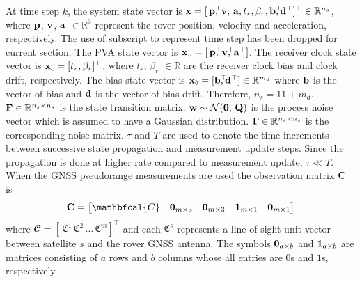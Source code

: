 At time step $k$, the system state vector is $\Boldx = [\,\Boldp^\top \dss,  \, \Boldv^\top \dss, \, \Bolda^\top \dss, t_r, \beta_r, \Boldb^\top \dss, \Boldd^\top ]^\top \in \mathbb{R}^{n_s} $, where $\mathbf{p}$, $\mathbf{v}$, $\mathbf{a}$ $\in \mathbb{R}^3$ represent the rover position, velocity and acceleration, respectively.
The use of subscript to represent time step has been dropped for current section. 
The PVA state vector is $\Boldx_v = [\,\Boldp^\top \dss,  \, \Boldv^\top \dss, \, \Bolda^\top]$.
The receiver clock state vector is $\mathbf{x}_c = [t_r, \beta_r]^\top$, where $t_r$, $\beta_r$ $\in \mathbb{R}$ are the receiver clock bias and clock drift, respectively. 
The bias state vector is $\mathbf{x}_b = [ \mathbf{b}^\top \!\!\!\!, \mathbf{d}^\top ] \in \mathbb{R}^{m_d}$ where $\mathbf{b}$ is the vector of bias and $\mathbf{d}$ is the vector of bias drift. 
Therefore, $n_s = 11 + m_d$. $\mathbf{F} \in \mathbb{R}^{n_s \times n_s}$ is the state transition matrix.
$\mathbf{w} \sim \mathcal{N}(\boldsymbol{0},\,\mathbf{Q})$ is the process noise vector which is assumed to have a Gaussian distribution. $\boldsymbol{\Gamma} \in \mathbb{R}^{n_s \times n_s}$ is the corresponding noise matrix. $\tau$ and $T$ are used to denote the time increments between successive state propagation and measurement update steps. 
Since the propagation is done at higher rate compared to measurement update, $\tau \ll T$.
When the GNSS pseudorange measurements are used the observation matrix $\mathbf{C}$ is
\begin{equation}
	\BoldC = \begin{bmatrix}		
		\mathbfcal{C} & \0_{m \times 3} & \0_{m \times 3} & \1_{m \times 1} & \0_{m \times 1} \\		
	\end{bmatrix}
\end{equation}
where $\mathbfcal{C} = [\, \mathfrak{C}^1 \, \mathfrak{C}^2 \, \dots \, \mathfrak{C}^m ]^\top$ and each $\mathfrak{C}^s$ represents a line-of-sight unit vector between satellite $s$ and the rover GNSS antenna. 
The symbols $\boldsymbol{0}_{a \times b}$ and $\boldsymbol{1}_{a \times b}$ are  matrices consisting of $a$ rows and $b$ columns whose all entries are $0$s and $1$s, respectively. 


